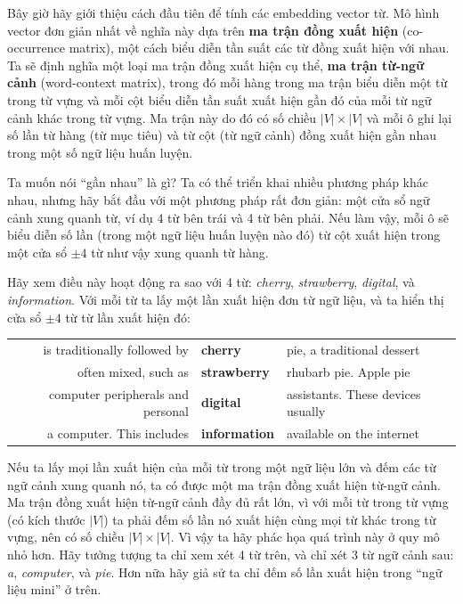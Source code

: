 Bây giờ hãy giới thiệu cách đầu tiên để tính các embedding vector từ. Mô hình vector đơn giản nhất về nghĩa này dựa trên \textbf{ma trận đồng xuất hiện} (co-occurrence matrix), một cách biểu diễn tần suất các từ đồng xuất hiện với nhau. Ta sẽ định nghĩa một loại ma trận đồng xuất hiện cụ thể, \textbf{ma trận từ-ngữ cảnh} (word-context matrix), trong đó mỗi hàng trong ma trận biểu diễn một từ trong từ vựng và mỗi cột biểu diễn tần suất xuất hiện gần đó của mỗi từ ngữ cảnh khác trong từ vựng. Ma trận này do đó có số chiều $|V| \times |V|$ và mỗi ô ghi lại số lần từ hàng (từ mục tiêu) và từ cột (từ ngữ cảnh) đồng xuất hiện gần nhau trong một số ngữ liệu huấn luyện.

Ta muốn nói ``gần nhau'' là gì? Ta có thể triển khai nhiều phương pháp khác nhau, nhưng hãy bắt đầu với một phương pháp rất đơn giản: một cửa sổ ngữ cảnh xung quanh từ, ví dụ 4 từ bên trái và 4 từ bên phải. Nếu làm vậy, mỗi ô sẽ biểu diễn số lần (trong một ngữ liệu huấn luyện nào đó) từ cột xuất hiện trong một cửa sổ $\pm 4$ từ như vậy xung quanh từ hàng.

Hãy xem điều này hoạt động ra sao với 4 từ: \emph{cherry}, \emph{strawberry}, \emph{digital}, và \emph{information}. Với mỗi từ ta lấy một lần xuất hiện đơn từ ngữ liệu, và ta hiển thị cửa sổ $\pm 4$ từ từ lần xuất hiện đó:

\begin{center}
\begin{tabular}{r l l}
is traditionally followed by & \textbf{cherry} & pie, a traditional dessert \\
often mixed, such as & \textbf{strawberry} & rhubarb pie. Apple pie \\
computer peripherals and personal & \textbf{digital} & assistants. These devices usually \\
a computer. This includes & \textbf{information} & available on the internet \\
\end{tabular}
\end{center}

Nếu ta lấy mọi lần xuất hiện của mỗi từ trong một ngữ liệu lớn và đếm các từ ngữ cảnh xung quanh nó, ta có được một ma trận đồng xuất hiện từ-ngữ cảnh. Ma trận đồng xuất hiện từ-ngữ cảnh đầy đủ rất lớn, vì với mỗi từ trong từ vựng (có kích thước $|V|$) ta phải đếm số lần nó xuất hiện cùng mọi từ khác trong từ vựng, nên có số chiều $|V| \times |V|$. Vì vậy ta hãy phác họa quá trình này ở quy mô nhỏ hơn. Hãy tưởng tượng ta chỉ xem xét 4 từ trên, và chỉ xét 3 từ ngữ cảnh sau: \emph{a}, \emph{computer}, và \emph{pie}. Hơn nữa hãy giả sử ta chỉ đếm số lần xuất hiện trong ``ngữ liệu mini'' ở trên.

